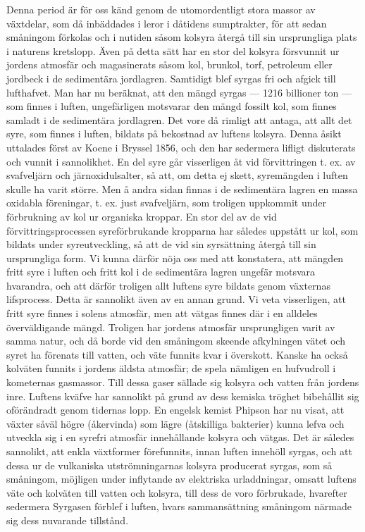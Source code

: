 \documentclass[a4paper, 12pt, oneside, swedish]{article}
\begin{document}
Denna period är för oss känd genom de utomordentligt stora massor av växtdelar, som då inbäddades i leror i dåtidens sumptrakter, för att sedan småningom förkolas och i nutiden såsom kolsyra återgå till sin ursprungliga plats i naturens kretslopp. Även på detta sätt har en stor del kolsyra försvunnit ur jordens atmosfär och magasinerats såsom kol, brunkol, torf, petroleum eller jordbeck i de sedimentära jordlagren. Samtidigt blef syrgas fri och afgick till lufthafvet. Man har nu beräknat, att den mängd syrgas --- 1216 billioner ton --- som finnes i luften, ungefärligen motsvarar den mängd fossilt kol, som finnes samladt i de sedimentära jordlagren. Det vore då rimligt att antaga, att allt det syre, som finnes i luften, bildats på bekostnad av luftens kolsyra. Denna åsikt uttalades först av Koene i Bryssel 1856, och den har sedermera lifligt diskuterats och vunnit i sannolikhet. En del syre går visserligen åt vid förvittringen t. ex. av svafveljärn och järnoxidulsalter, så att, om detta ej skett, syremängden i luften skulle ha varit större. Men å andra sidan finnas i de sedimentära lagren en massa oxidabla föreningar, t. ex. just svafveljärn, som troligen uppkommit under förbrukning av kol ur organiska kroppar. En stor del av de vid förvittringsprocessen syreförbrukande kropparna har således uppstått ur kol, som bildats under syreutveckling, så att de vid sin syrsättning återgå till sin ursprungliga form. Vi kunna därför nöja oss med att konstatera, att mängden fritt syre i luften och fritt kol i de sedimentära lagren ungefär motsvara hvarandra, och att därför troligen allt luftens syre bildats genom växternas lifsprocess. Detta är sannolikt även av en annan grund. Vi veta visserligen, att fritt syre finnes i solens atmosfär, men att vätgas finnes där i en alldeles överväldigande mängd. Troligen har jordens atmosfär ursprungligen varit av samma natur, och då borde vid den småningom skeende afkylningen vätet och syret ha förenats till vatten, och väte funnits kvar i överskott. Kanske ha också kolväten funnits i jordens äldsta atmosfär; de spela nämligen en hufvudroll i kometernas gasmassor. Till dessa gaser sällade sig kolsyra och vatten från jordens inre. Luftens kväfve har sannolikt på grund av dess kemiska tröghet bibehållit sig oförändradt genom tidernas lopp. En engelsk kemist Phipson har nu visat, att växter såväl högre (åkervinda) som lägre (åtskilliga bakterier) kunna lefva och utveckla sig i en syrefri atmosfär innehållande kolsyra och vätgas. Det är således sannolikt, att enkla växtformer förefunnits, innan luften innehöll syrgas, och att dessa ur de vulkaniska utströmningarnas kolsyra producerat syrgas, som så småningom, möjligen under inflytande av elektriska urladdningar, omsatt luftens väte och kolväten till vatten och kolsyra, till dess de voro förbrukade, hvarefter sedermera Syrgasen förblef i luften, hvars sammansättning småningom närmade sig dess nuvarande tillstånd.
\end{document}

